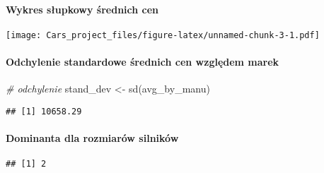 \documentclass[
]{article}
\newenvironment{Shaded}{\begin{snugshade}}{\end{snugshade}}
\newcommand{\CommentTok}[1]{\textcolor[rgb]{0.56,0.35,0.01}{\textit{#1}}}
\newcommand{\ControlFlowTok}[1]{\textcolor[rgb]{0.13,0.29,0.53}{\textbf{#1}}}
\newcommand{\FunctionTok}[1]{\textcolor[rgb]{0.00,0.00,0.00}{#1}}
\newcommand{\NormalTok}[1]{#1}
\newcommand{\OtherTok}[1]{\textcolor[rgb]{0.56,0.35,0.01}{#1}}
\newcommand{\SpecialCharTok}[1]{\textcolor[rgb]{0.00,0.00,0.00}{#1}}
\begin{document}
\hypertarget{wykres-sux142upkowy-ux15brednich-cen}{%
\paragraph{Wykres słupkowy średnich
cen}\label{wykres-sux142upkowy-ux15brednich-cen}}

\texttt{[image: Cars\_project\_files/figure-latex/unnamed-chunk-3-1.pdf]}

\hypertarget{odchylenie-standardowe-ux15brednich-cen-wzglux119dem-marek}{%
\paragraph{Odchylenie standardowe średnich cen względem
marek}\label{odchylenie-standardowe-ux15brednich-cen-wzglux119dem-marek}}

\begin{Shaded}
\begin{Highlighting}[]
\CommentTok{\# odchylenie}
\NormalTok{stand\_dev }\OtherTok{\textless{}{-}} \FunctionTok{sd}\NormalTok{(avg\_by\_manu)}
\end{Highlighting}
\end{Shaded}

\begin{verbatim}
## [1] 10658.29
\end{verbatim}

\hypertarget{dominanta-dla-rozmiaruxf3w-silnikuxf3w}{%
\paragraph{Dominanta dla rozmiarów
silników}\label{dominanta-dla-rozmiaruxf3w-silnikuxf3w}}

\begin{Shaded}
\end{Shaded}

\begin{verbatim}
## [1] 2
\end{verbatim}
\end{document}
